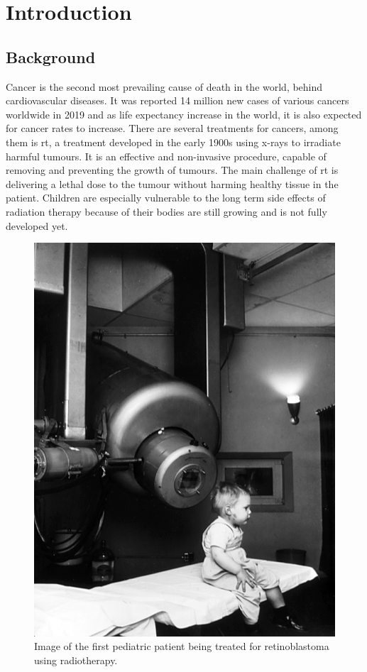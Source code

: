 \documentclass[main.tex]{subfiles}
\begin{document}
\section{Introduction}

\subsection{Background}

Cancer is the second most prevailing cause of death in the world, behind cardiovascular diseases. It was reported 14 million new cases of various cancers worldwide in 2019 \cite{porcine_2021} and as life expectancy increase in the world, it is also expected for cancer rates to increase. There are several treatments for cancers, among them is \gls{rt}, a treatment developed in the early 1900s using x-rays to irradiate harmful tumours. It is an effective and non-invasive procedure, capable of removing and preventing the growth of tumours. The main challenge of \gls{rt} is delivering a lethal dose to the tumour without harming healthy tissue in the patient. Children are especially vulnerable to the long term side effects of radiation therapy because of their bodies are still growing and is not fully developed yet.

\begin{figure}[!ht]
    \centering
    \includegraphics[scale = 0.4]{images/rt_intro.jpg}
    \caption{Image of the first pediatric patient being treated for retinoblastoma using radiotherapy.\cite{rt_intro}}
    \label{fig: rt_intro}
\end{figure}
\FloatBarrier
\end{document}
